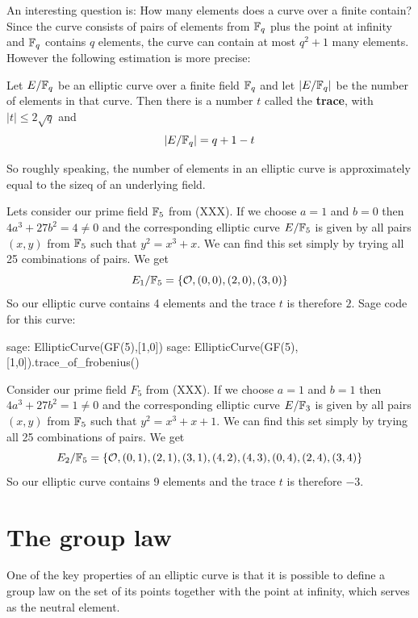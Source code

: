 An interesting question is: How many elements does a curve over a finite contain? Since the curve consists of pairs of elements from $\mathbb{F}_q$ plus the point at infinity and $\mathbb{F}_q$ contains $q$ elements, the curve can contain at most $q^2+1$ many elements. However the following estimation is more precise:
\begin{theorem} Let $E/\mathbb{F}_q$ be an elliptic curve over a finite field $\mathbb{F}_q$ and let $|E/\mathbb{F}_q|$ be the number of elements in that curve. Then there is a number $t$ called the \textbf{trace}, with $|t| \leq 2\sqrt{q}$ and
$$
|E/\mathbb{F}_q| = q +1 -t
$$
\end{theorem}
So roughly speaking, the number of elements in an elliptic curve is approximately equal to the sizeq of an underlying field.
\begin{example}Lets consider our prime field $\mathbb{F}_5$ from (XXX). If we choose $a=1$ and $b=0$ then $4a^3+ 27b^2 = 4 \neq  0 $ and the corresponding elliptic curve $E/\mathbb{F}_{5}$ is given by all pairs $(x,y)$ from $\mathbb{F}_5$ such that $y^2=x^3+x$. We can find this set simply by trying all 25 combinations of pairs. We get
$$
E_1/\mathbb{F}_5 = \{\mathcal{O}, (0,0),(2,0),(3,0)\}
$$
So our elliptic curve contains 4 elements and the trace $t$ is therefore $2$. Sage code for this curve:
\begin{sagecommandline}
sage: EllipticCurve(GF(5),[1,0])
sage: EllipticCurve(GF(5),[1,0]).trace_of_frobenius()
\end{sagecommandline}
\end{example}
\begin{example}Consider our prime field $F_5$ from (XXX). If we choose $a=1$ and $b=1$ then $4a^3+ 27b^2 = 1 \neq  0 $ and the corresponding elliptic curve $E/\mathbb{F}_{3}$ is given by all pairs $(x,y)$ from $\mathbb{F}_5$ such that $y^2=x^3+x+1$. We can find this set simply by trying all 25 combinations of pairs. We get
$$
E_2/\mathbb{F}_5 = \{\mathcal{O}, (0,1),(2,1),(3,1),(4,2),(4,3),(0,4),(2,4),(3,4)\}
$$
So our elliptic curve contains 9 elements and the trace $t$ is therefore $-3$.
\end{example}

\section{The group law}
One of the key properties of an elliptic curve is that it is possible to define a group law on the set of its points together with the point at infinity, which serves as the neutral element.

